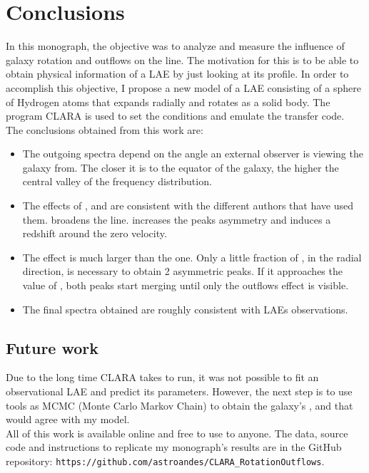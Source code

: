 \setcounter{equation}{0}
\chapter{Conclusions}
In this monograph, the objective was to analyze and measure the influence of galaxy rotation and outflows on the \lya line. The motivation for this is to be able to obtain physical information of a LAE by just looking at its \lya profile. In order to accomplish this objective, I propose a new model of a LAE consisting of a sphere of Hydrogen atoms that expands radially and rotates as a solid body. The program CLARA \cite{CLARA} is used to set the conditions and emulate the transfer code. \\

The conclusions obtained from this work are: \\

\begin{itemize}
\item The outgoing spectra depend on the angle an external observer is viewing the galaxy from. The closer it is to the equator of the galaxy, the higher the central valley of the frequency distribution. \\

\item The effects of \vrot, \vout and \tauh are consistent with the different authors that have used them. \vrot broadens the \lya line. \vout increases the peaks asymmetry and \tauh induces a redshift around the zero velocity.\\

\item The \vrot effect is much larger than the \vout one. Only a little fraction of \vrot, in the radial direction, is necessary to obtain 2 asymmetric peaks. If it \vout approaches the value of \vrot, both peaks start merging until only the outflows effect is visible. \\

\item The final spectra obtained are roughly consistent with LAEs observations.  \\

\end{itemize}

\section{Future work}

Due to the long time CLARA takes to run, it was not possible to fit an observational LAE and predict its parameters. However, the next step is to use tools as MCMC (Monte Carlo Markov Chain) to obtain the galaxy's \tauh, \vrot and \vout that would agree with my model. \\

All of this work is available online and free to use to anyone. The data, source code and instructions to replicate my monograph's results are in the GitHub repository:  \texttt{https://github.com/astroandes/CLARA\_RotationOutflows}. \\
